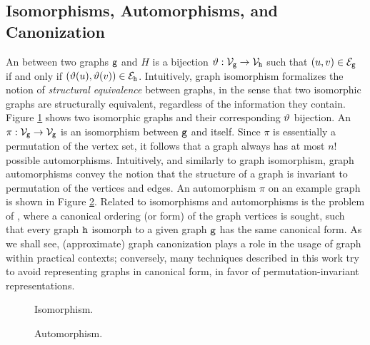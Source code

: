 \subsection{Isomorphisms, Automorphisms, and Canonization} \label{sec:isomorphisms}
An  between two graphs $\mathtt{g}$ and $H$ is a bijection $\Isomorph: \Nodes_{\Graph{g}}\rightarrow \Nodes_{\Graph{h}}$ such that $(u,v) \in \Edges_{\Graph{g}}$ if and only if $(\Isomorph(u),\Isomorph(v)) \in \Edges_{\Graph{h}}$. Intuitively, graph isomorphism formalizes the notion of \emph{structural equivalence} between graphs, in the sense that two isomorphic graphs are structurally equivalent, regardless of the information they contain. Figure \ref{fig:isomorphism} shows two isomorphic graphs and their corresponding $\vartheta$ bijection. An  $\pi: \Nodes_{\Graph{g}}\rightarrow \Nodes_{\Graph{g}}$ is an isomorphism between $\mathtt{g}$ and itself. Since $\pi$ is essentially a permutation of the vertex set, it follows that a graph always has at most $n!$ possible automorphisms. Intuitively, and similarly to graph isomorphism, graph automorphisms convey the notion that the structure of a graph is invariant to permutation of the vertices and edges. An automorphism $\pi$ on an example graph is shown
in Figure \ref{fig:automorphism}. Related to isomorphisms and automorphisms is the problem of , where a canonical ordering (or form) of the graph vertices is sought, such that every graph $\mathtt{h}$ isomorph to a given graph $\mathtt{g}$ has the same canonical form. As we shall see, (approximate) graph canonization plays a role in the usage of graph within practical contexts; conversely, many techniques described in this work try to avoid representing graphs in canonical form, in favor of permutation-invariant representations.

\begin{figure*}
    \begin{subfigure}[b]{0.48\linewidth}
        \centering
        \resizebox{.9\textwidth}{!}{}
        \caption{Isomorphism.}
        \label{fig:isomorphism}
    \end{subfigure}
    \begin{subfigure}[b]{0.48\linewidth}
        \centering
        \resizebox{.9\textwidth}{!}{}
        \caption{Automorphism.}
        \label{fig:automorphism}
    \end{subfigure}
    \caption{An example of isomorphism and automorphism.}
\end{figure*}

